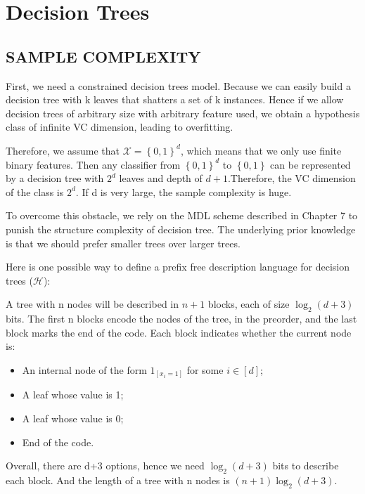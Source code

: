 
\section{Decision Trees}%

\subsection{SAMPLE COMPLEXITY}%

First, we need a constrained decision trees model.
Because we can easily build a decision tree with k leaves that shatters a set of k instances.
Hence if we allow decision trees of arbitrary size with arbitrary feature used, we obtain a hypothesis class of infinite VC dimension, leading to overfitting.

Therefore, we assume that $ \mathcal{X} = {\left\{ 0, 1 \right\}}^{d} $, which means that we only use finite binary features. Then any classifier from $ {\left\{ 0, 1 \right\}}^{d} $ to $ \left\{ 0, 1 \right\} $ can be represented by a decision tree with $ 2^d $ leaves and depth of $ d+1 $.Therefore, the VC dimension of the class is $ 2^d $. If d is very large, the sample complexity is huge.

To overcome this obstacle, we rely on the MDL scheme described in Chapter 7 to punish the structure complexity of decision tree. The underlying prior knowledge is that we should prefer smaller trees over larger trees.

Here is one possible way to define a prefix free description language for decision trees ($ \mathcal{H} $):

A tree with n nodes will be described in $ n+1 $ blocks, each of size $ \log_2(d+3) $ bits.
The first n blocks encode the nodes of the tree, in the preorder, and the last block marks the end of the code. Each block indicates whether the current node is:
\begin{itemize}
    \item An internal node of the form $ 1_{ [x_i = 1] } $ for some $ i \in [d] $;
    \item A leaf whose value is 1;
    \item A leaf whose value is 0;
    \item End of the code.
\end{itemize}
Overall, there are d+3 options, hence we need $ \log_2(d+3) $ bits to describe each block. And the length of a tree with n nodes is $ (n+1)\log_2(d+3) $.

